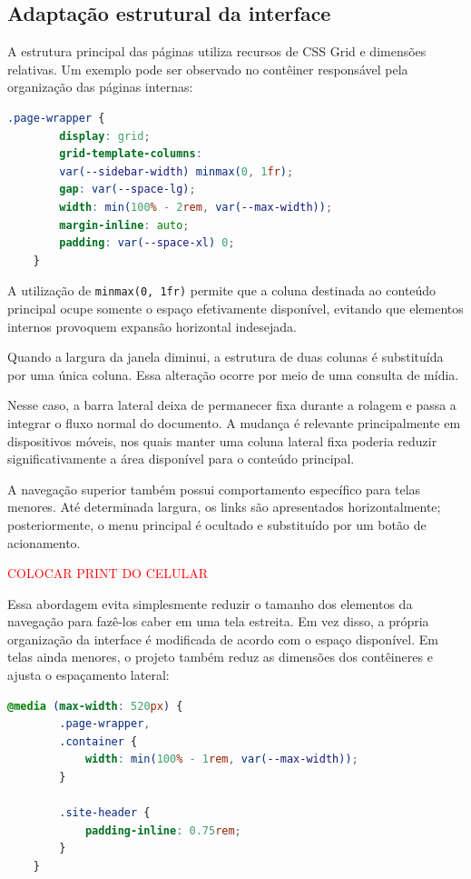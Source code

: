 \subsection{Adaptação estrutural da interface}

A estrutura principal das páginas utiliza recursos de CSS Grid e dimensões relativas. Um exemplo pode ser observado no contêiner responsável pela organização das páginas internas:

\begin{lstlisting}[language=CSS, caption={Estrutura responsiva da área principal das páginas internas.}, label={lst:pagewrapper}]
	.page-wrapper {
		display: grid;
		grid-template-columns:
		var(--sidebar-width) minmax(0, 1fr);
		gap: var(--space-lg);
		width: min(100% - 2rem, var(--max-width));
		margin-inline: auto;
		padding: var(--space-xl) 0;
	}
\end{lstlisting}

A utilização de \texttt{minmax(0, 1fr)} permite que a coluna destinada ao conteúdo principal ocupe somente o espaço efetivamente disponível, evitando que elementos internos provoquem expansão horizontal indesejada.

Quando a largura da janela diminui, a estrutura de duas colunas é substituída por uma única coluna. Essa alteração ocorre por meio de uma consulta de mídia.

Nesse caso, a barra lateral deixa de permanecer fixa durante a rolagem e passa a integrar o fluxo normal do documento. A mudança é relevante principalmente em dispositivos móveis, nos quais manter uma coluna lateral fixa poderia reduzir significativamente a área disponível para o conteúdo principal.

A navegação superior também possui comportamento específico para telas menores. Até determinada largura, os links são apresentados horizontalmente; posteriormente, o menu principal é ocultado e substituído por um botão de acionamento.

\textcolor{red}{COLOCAR PRINT DO CELULAR}

Essa abordagem evita simplesmente reduzir o tamanho dos elementos da navegação para fazê-los caber em uma tela estreita. Em vez disso, a própria organização da interface é modificada de acordo com o espaço disponível. Em telas ainda menores, o projeto também reduz as dimensões dos contêineres e ajusta o espaçamento lateral:

\begin{lstlisting}[language=CSS, caption={Redução dos espaçamentos em telas muito estreitas.}, label={lst:responsive520}]
	@media (max-width: 520px) {
		.page-wrapper,
		.container {
			width: min(100% - 1rem, var(--max-width));
		}
		
		.site-header {
			padding-inline: 0.75rem;
		}
	}
\end{lstlisting}

